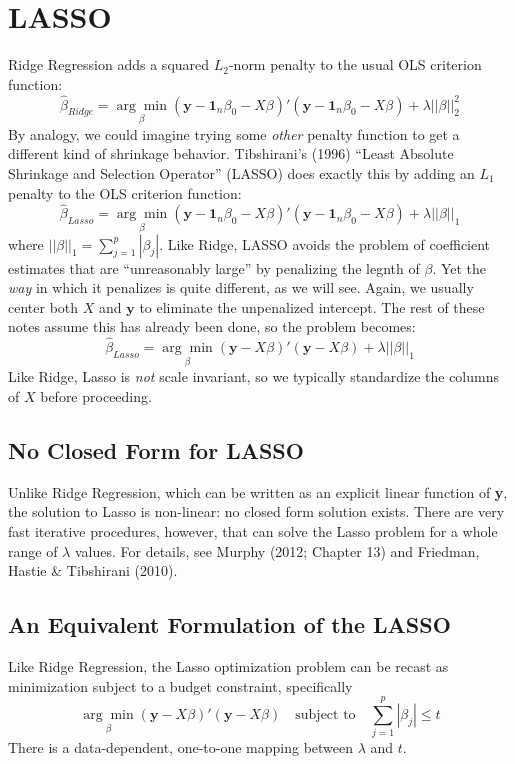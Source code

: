 \documentclass[12pt]{article}
\theoremstyle{definition}
\begin{document}
\section{LASSO}
Ridge Regression adds a squared $L_2$-norm penalty to the usual OLS criterion function:
	$$\widehat{\beta}_{Ridge} =\underset{\beta}{\arg \min} (\mathbf{y} - \textbf{1}_n\beta_0 - X\beta)' (\mathbf{y} - \textbf{1}_n \beta_0 - X\beta) + \lambda \left| \left| \beta\right| \right|_2^2$$
By analogy, we could imagine trying some \emph{other} penalty function to get a different kind of shrinkage behavior. Tibshirani's (1996) ``Least Absolute Shrinkage and Selection Operator'' (LASSO) does exactly this by adding an $L_1$ penalty to the OLS criterion function:
	$$\widehat{\beta}_{Lasso} =\underset{\beta}{\arg \min} (\mathbf{y} - \textbf{1}_n\beta_0 - X\beta)' (\mathbf{y} - \textbf{1}_n \beta_0 - X\beta) + \lambda \left| \left| \beta\right| \right|_1$$
where $\left| \left| \beta\right|\right|_1 = \sum_{j=1}^p |\beta_j|$. Like Ridge, LASSO avoids the problem of coefficient estimates that are ``unreasonably large'' by penalizing the legnth of $\beta$. Yet the \emph{way} in which it penalizes is quite different, as we will see. Again, we usually center both $X$ and $\mathbf{y}$ to eliminate the unpenalized intercept. The rest of these notes assume this has already been done, so the problem becomes:
	$$\widehat{\beta}_{Lasso} =\underset{\beta}{\arg \min} (\mathbf{y}  - X\beta)' (\mathbf{y} - X\beta) + \lambda \left| \left| \beta\right| \right|_1$$
Like Ridge, Lasso is \emph{not} scale invariant, so we typically standardize the columns of $X$ before proceeding.

\subsection{No Closed Form for LASSO}
Unlike Ridge Regression, which can be written as an explicit linear function of \textbf{y}, the solution to Lasso is non-linear: no closed form solution exists. There are very fast iterative procedures, however, that can solve the Lasso problem for a whole range of $\lambda$ values. For details, see Murphy (2012; Chapter 13) and Friedman, Hastie \& Tibshirani (2010). 

\subsection{An Equivalent Formulation of the LASSO}
Like Ridge Regression, the Lasso optimization problem can be recast as minimization subject to a budget constraint, specifically
	$$\underset{\beta}{\arg \min} (\mathbf{y}  - X\beta)' (\mathbf{y} - X\beta) \quad \mbox{subject to}\quad \sum_{j=1}^p |\beta_j| \leq t$$
There is a data-dependent, one-to-one mapping between $\lambda$ and $t$.
\end{document}
